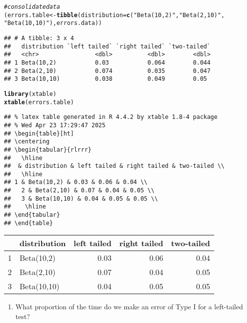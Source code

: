 \documentclass{article}\usepackage[]{graphicx}\usepackage[]{xcolor}
\makeatletter
\newcommand{\hlsng}[1]{\textcolor[rgb]{0.192,0.494,0.8}{#1}}%
\newcommand{\hlcom}[1]{\textcolor[rgb]{0.678,0.584,0.686}{\textit{#1}}}%
\newcommand{\hldef}[1]{\textcolor[rgb]{0.345,0.345,0.345}{#1}}%
\newcommand{\hlkwb}[1]{\textcolor[rgb]{0.69,0.353,0.396}{#1}}%
\newcommand{\hlkwc}[1]{\textcolor[rgb]{0.333,0.667,0.333}{#1}}%
\newcommand{\hlkwd}[1]{\textcolor[rgb]{0.737,0.353,0.396}{\textbf{#1}}}%
\newenvironment{kframe}{%
 \def\at@end@of@kframe{}%
 \ifinner\ifhmode%
  \def\at@end@of@kframe{\end{minipage}}%
  \begin{minipage}{\columnwidth}%
 \fi\fi%
 \def\FrameCommand##1{\hskip\@totalleftmargin \hskip-\fboxsep
 \colorbox{shadecolor}{##1}\hskip-\fboxsep
     \hskip-\linewidth \hskip-\@totalleftmargin \hskip\columnwidth}%
 \MakeFramed {\advance\hsize-\width
   \@totalleftmargin\z@ \linewidth\hsize
   \@setminipage}}%
 {\par\unskip\endMakeFramed%
 \at@end@of@kframe}
\newenvironment{knitrout}{}{} %
\makeatother
\begin{document}
\begin{enumerate}
\begin{knitrout}
\begin{kframe}
\begin{alltt}
\hlcom{# consolidate data }
\hldef{(errors.table} \hlkwb{<-} \hlkwd{tibble}\hldef{(}\hlkwc{distribution} \hldef{=} \hlkwd{c}\hldef{(}\hlsng{"Beta(10,2)"}\hldef{,} \hlsng{"Beta(2,10)"}\hldef{,}
                                    \hlsng{"Beta(10,10)"}\hldef{), errors.data))}
\end{alltt}
\begin{verbatim}
## # A tibble: 3 x 4
##   distribution `left tailed` `right tailed` `two-tailed`
##   <chr>                <dbl>          <dbl>        <dbl>
## 1 Beta(10,2)           0.03           0.064        0.044
## 2 Beta(2,10)           0.074          0.035        0.047
## 3 Beta(10,10)          0.038          0.049        0.05
\end{verbatim}
\begin{alltt}
\hlkwd{library}\hldef{(xtable)}
\hlkwd{xtable}\hldef{(errors.table)}
\end{alltt}
\begin{verbatim}
## % latex table generated in R 4.4.2 by xtable 1.8-4 package
## % Wed Apr 23 17:29:47 2025
## \begin{table}[ht]
## \centering
## \begin{tabular}{rlrrr}
##   \hline
##  & distribution & left tailed & right tailed & two-tailed \\ 
##   \hline
## 1 & Beta(10,2) & 0.03 & 0.06 & 0.04 \\ 
##   2 & Beta(2,10) & 0.07 & 0.04 & 0.05 \\ 
##   3 & Beta(10,10) & 0.04 & 0.05 & 0.05 \\ 
##    \hline
## \end{tabular}
## \end{table}
\end{verbatim}
\end{kframe}
\end{knitrout}

\begin{table}[ht]
\centering
\begin{tabular}{rlrrr}
\hline
& distribution & left tailed & right tailed & two-tailed \\
\hline
1 & Beta(10,2) & 0.03 & 0.06 & 0.04 \\
2 & Beta(2,10) & 0.07 & 0.04 & 0.05 \\
3 & Beta(10,10) & 0.04 & 0.05 & 0.05 \\
\hline
\end{tabular}
\end{table}
  
  \begin{enumerate}
    \item What proportion of the time do we make an error of Type I for a
    left-tailed test?
    

\end{enumerate}
\end{enumerate}
\end{document}
